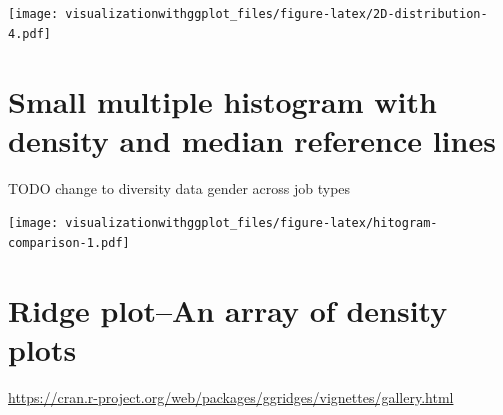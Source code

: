 \documentclass[]{krantz}
\makeatletter
\newenvironment{Shaded}{\begin{snugshade}}{\end{snugshade}}
\newcommand{\DataTypeTok}[1]{\textcolor[rgb]{0.13,0.29,0.53}{#1}}
\newcommand{\DecValTok}[1]{\textcolor[rgb]{0.00,0.00,0.81}{#1}}
\newcommand{\FloatTok}[1]{\textcolor[rgb]{0.00,0.00,0.81}{#1}}
\newcommand{\KeywordTok}[1]{\textcolor[rgb]{0.13,0.29,0.53}{\textbf{#1}}}
\newcommand{\NormalTok}[1]{#1}
\newcommand{\OperatorTok}[1]{\textcolor[rgb]{0.81,0.36,0.00}{\textbf{#1}}}
\newcommand{\StringTok}[1]{\textcolor[rgb]{0.31,0.60,0.02}{#1}}
\newenvironment{kframe}{%
\medskip{}
\setlength{\fboxsep}{.8em}
 \def\at@end@of@kframe{}%
 \ifinner\ifhmode%
  \def\at@end@of@kframe{\end{minipage}}%
  \begin{minipage}{\columnwidth}%
 \fi\fi%
 \def\FrameCommand##1{\hskip\@totalleftmargin \hskip-\fboxsep
 \colorbox{shadecolor}{##1}\hskip-\fboxsep
     \hskip-\linewidth \hskip-\@totalleftmargin \hskip\columnwidth}%
 \MakeFramed {\advance\hsize-\width
   \@totalleftmargin\z@ \linewidth\hsize
   \@setminipage}}%
 {\par\unskip\endMakeFramed%
 \at@end@of@kframe}
\renewenvironment{Shaded}{\begin{kframe}}{\end{kframe}}
\makeatother
\begin{document}
\texttt{[image: visualizationwithggplot\_files/figure-latex/2D-distribution-4.pdf]}

\hypertarget{tufte-smallmultiples}{%
\section{Small multiple histogram with density and median reference lines}\label{tufte-smallmultiples}}

TODO change to diversity data gender across job types

\begin{Shaded}
\end{Shaded}

\texttt{[image: visualizationwithggplot\_files/figure-latex/hitogram-comparison-1.pdf]}

\hypertarget{ridge-plotan-array-of-density-plots}{%
\section{Ridge plot--An array of density plots}\label{ridge-plotan-array-of-density-plots}}

\url{https://cran.r-project.org/web/packages/ggridges/vignettes/gallery.html}
\end{document}

